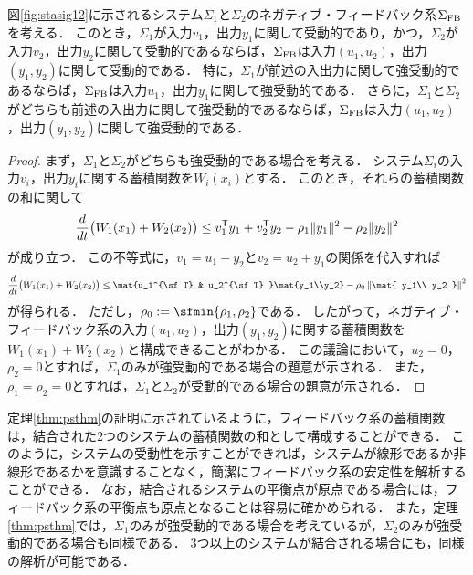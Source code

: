 \documentclass[a4j,10pt,oneside,openany,dvipdfmx]{jsbook}
\begin{document}
\begin{theorem}\label{thm:psthm}
図\ref{fig:stasig12}に示されるシステム$\Sigma_1$と$\Sigma_2$のネガティブ・フィードバック系$\Sigma_{\rm FB}$を考える．
このとき，$\Sigma_1$が入力$v_1$，出力$y_1$に関して受動的であり，かつ，$\Sigma_2$が入力$v_2$，出力$y_2$に関して受動的であるならば，$\Sigma_{\rm FB}$は入力$(u_1,u_2)$，出力$(y_1,y_2)$に関して受動的である．
特に，$\Sigma_1$が前述の入出力に関して強受動的であるならば，$\Sigma_{\rm FB}$は入力$u_1$，出力$y_1$に関して強受動的である．
さらに，$\Sigma_1$と$\Sigma_2$がどちらも前述の入出力に関して強受動的であるならば，$\Sigma_{\rm FB}$は入力$(u_1,u_2)$，出力$(y_1,y_2)$に関して強受動的である．
\end{theorem}

\begin{proof}
まず，$\Sigma_1$と$\Sigma_2$がどちらも強受動的である場合を考える．
システム$\Sigma_i$の入力$v_i$，出力$y_i$に関する蓄積関数を$W_i(x_i)$とする．
このとき，それらの蓄積関数の和に関して
\[
\frac{d}{dt}\bigl(W_1(x_1) + W_2(x_2) \bigr) \leq v_1^{\sf T}y_1 + v_2^{\sf T}y_2 
- \rho_1 \|y_1\|^2 - \rho_2 \|y_2\|^2
\]
が成り立つ．
この不等式に，$v_1=u_1 -y_2$と$v_2=u_2 +y_1$の関係を代入すれば
\[
\frac{d}{dt}\bigl(W_1(x_1) + W_2(x_2) \bigr) \leq \mat{u_1^{\sf T} & u_2^{\sf T} }\mat{y_1\\y_2} 
-\rho_{0} 
\left\|
\mat{
y_1\\
y_2
}
\right\|^2
\]
が得られる．
ただし，$\rho_{0}:=\sfmin \{\rho_1,\rho_2\}$である．
したがって，ネガティブ・フィードバック系の入力$(u_1,u_2)$，出力$(y_1,y_2)$に関する蓄積関数を$W_1(x_1)+W_2(x_2)$と構成できることがわかる．
この議論において，$u_2=0$，$\rho_2=0$とすれば，$\Sigma_1$のみが強受動的である場合の題意が示される．
また，$\rho_1=\rho_2=0$とすれば，$\Sigma_1$と$\Sigma_2$が受動的である場合の題意が示される．
\proofend
\end{proof}

定理\ref{thm:psthm}の証明に示されているように，フィードバック系の蓄積関数は，結合された2つのシステムの蓄積関数の和として構成することができる．
このように，システムの受動性を示すことができれば，システムが線形であるか非線形であるかを意識することなく，簡潔にフィードバック系の安定性を解析することができる．
なお，結合されるシステムの平衡点が原点である場合には，フィードバック系の平衡点も原点となることは容易に確かめられる．
また，定理\ref{thm:psthm}では，$\Sigma_1$のみが強受動的である場合を考えているが，$\Sigma_2$のみが強受動的である場合も同様である．
3つ以上のシステムが結合される場合にも，同様の解析が可能である\cite{moylan1978stability}．
\end{document}
